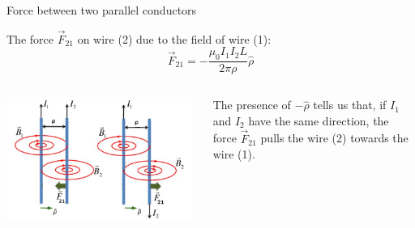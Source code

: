 %
%
%

\begin{frame}{Force between two parallel conductors}

The force $\vec{F}_{21}$ on wire (2) due to the field of wire (1):
\begin{equation*}
  \vec{F}_{21} = - \frac{\mu_0 I_{1} I_{2} L}{2\pi \rho} \hat{\rho}
\end{equation*}

\begin{columns}
  \begin{column}{0.70\textwidth}
    \begin{center}
      \includegraphics[width=0.98\textwidth]{./images/schematics/magnetic_force_between_wires_2_cases_02.png}\\
    \end{center}
  \end{column}
  \begin{column}{0.30\textwidth}
     The presence of $-\hat{\rho}$ tells us that, if $I_1$ and $I_2$ have the same direction,
     the force  $\vec{F}_{21}$ pulls the wire (2) towards the wire (1).
  \end{column}
\end{columns}

\end{frame}

%
%
%

